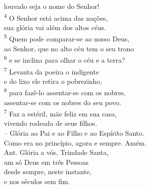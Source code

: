 \documentclass{book}
\begin{document}
\begin{center}
    louvado seja o nome do Senhor!
    \vspace{.2cm} \\
    \textsuperscript{\underline{\hspace{.07in}}\textcolor{VioletRed2}{4}} O Senhor está acima das nações, \textsuperscript{\gresixstar{}} \\
    sua glória vai além dos altos céus.\\
    \textsuperscript{\underline{\hspace{.07in}}\textcolor{VioletRed2}{5}} Quem pode comparar-se ao nosso Deus, \dag{} \\
    ao Senhor, que no alto céu tem o seu trono \textsuperscript{\gresixstar{}} \\
    \textsuperscript{\underline{\hspace{.07in}}\textcolor{VioletRed2}{6}} e se inclina para olhar o céu e a terra?
    \vspace{.2cm} \\
    \textsuperscript{\underline{\hspace{.07in}}\textcolor{VioletRed2}{7}} Levanta da poeira o indigente \textsuperscript{\gresixstar{}} \\
    e do lixo ele retira o pobrezinho, \\
    \textsuperscript{\underline{\hspace{.07in}}\textcolor{VioletRed2}{8}} para fazê-lo assentar-se com os nobres, \textsuperscript{\gresixstar{}} \\
    assentar-se com os nobres do seu povo. \\
    \textsuperscript{\underline{\hspace{.07in}}\textcolor{VioletRed2}{7}} Faz a estéril, mãe feliz em sua casa, \textsuperscript{\gresixstar{}} \\
    vivendo rodeada de seus filhos.
    \vspace{.2cm} \\
    -- Glória ao Pai e ao Filho e ao Espírito Santo. \\
    Como era no princípio, agora e sempre. Amém.
    \vspace{.2cm} \\
    \textcolor{VioletRed2}{Ant.} Glória a vós, Trindade Santa, \\
    um só Deus em três Pessoas \\
    desde sempre, neste instante, \\
    e nos séculos sem fim.
    \vspace{.2cm} \\

\end{center}
\end{document}
